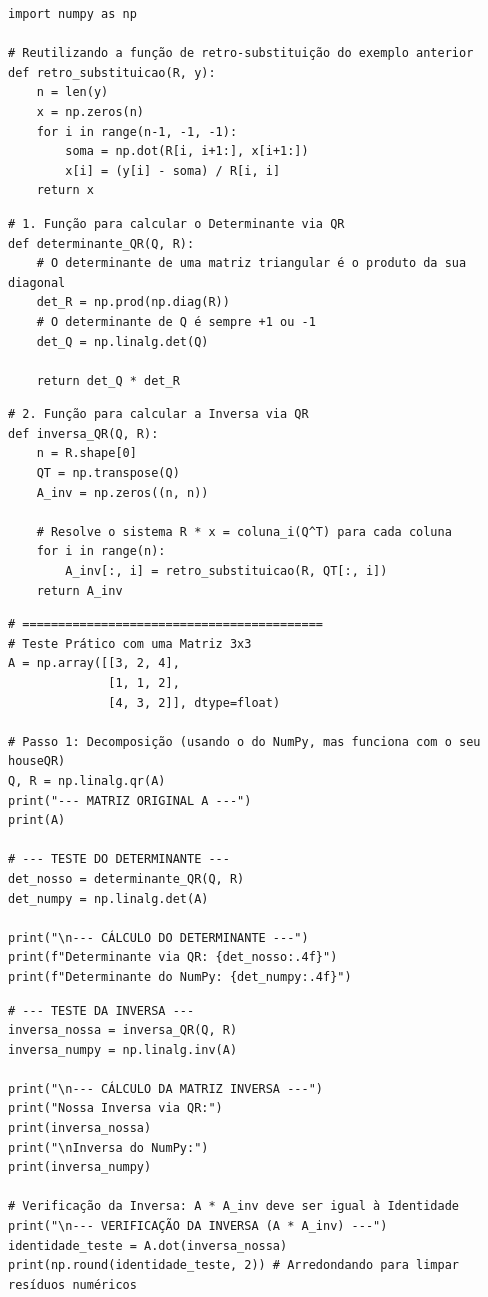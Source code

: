 \documentclass[../numerical_methods.tex]{subfiles}
\begin{document}
\begin{listing}[H]
	\caption{Determinantes e Inversas com Matriz QR}
	\begin{verbatim}
import numpy as np

# Reutilizando a função de retro-substituição do exemplo anterior
def retro_substituicao(R, y):
    n = len(y)
    x = np.zeros(n)
    for i in range(n-1, -1, -1):
        soma = np.dot(R[i, i+1:], x[i+1:])
        x[i] = (y[i] - soma) / R[i, i]
    return x
  \end{verbatim}
	\begin{verbatim}
# 1. Função para calcular o Determinante via QR
def determinante_QR(Q, R):
    # O determinante de uma matriz triangular é o produto da sua diagonal
    det_R = np.prod(np.diag(R))
    # O determinante de Q é sempre +1 ou -1
    det_Q = np.linalg.det(Q)

    return det_Q * det_R
  \end{verbatim}
	\begin{verbatim}
# 2. Função para calcular a Inversa via QR
def inversa_QR(Q, R):
    n = R.shape[0]
    QT = np.transpose(Q)
    A_inv = np.zeros((n, n))

    # Resolve o sistema R * x = coluna_i(Q^T) para cada coluna
    for i in range(n):
        A_inv[:, i] = retro_substituicao(R, QT[:, i])
    return A_inv
  \end{verbatim}
\end{listing}
\begin{listing}[H]
	\begin{verbatim}
# ==========================================
# Teste Prático com uma Matriz 3x3
A = np.array([[3, 2, 4],
              [1, 1, 2],
              [4, 3, 2]], dtype=float)

# Passo 1: Decomposição (usando o do NumPy, mas funciona com o seu houseQR)
Q, R = np.linalg.qr(A)
print("--- MATRIZ ORIGINAL A ---")
print(A)

# --- TESTE DO DETERMINANTE ---
det_nosso = determinante_QR(Q, R)
det_numpy = np.linalg.det(A)

print("\n--- CÁLCULO DO DETERMINANTE ---")
print(f"Determinante via QR: {det_nosso:.4f}")
print(f"Determinante do NumPy: {det_numpy:.4f}")
\end{verbatim}
	\begin{verbatim}
# --- TESTE DA INVERSA ---
inversa_nossa = inversa_QR(Q, R)
inversa_numpy = np.linalg.inv(A)

print("\n--- CÁLCULO DA MATRIZ INVERSA ---")
print("Nossa Inversa via QR:")
print(inversa_nossa)
print("\nInversa do NumPy:")
print(inversa_numpy)

# Verificação da Inversa: A * A_inv deve ser igual à Identidade
print("\n--- VERIFICAÇÃO DA INVERSA (A * A_inv) ---")
identidade_teste = A.dot(inversa_nossa)
print(np.round(identidade_teste, 2)) # Arredondando para limpar resíduos numéricos
\end{verbatim}
\end{listing}
\end{document}

